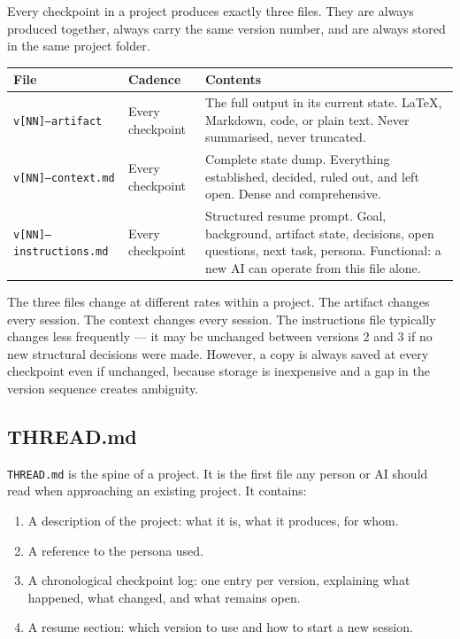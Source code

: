 \documentclass[12pt,letterpaper]{article}
\begin{document}
Every checkpoint in a project produces exactly three files.
They are always produced together, always carry the same version number,
and are always stored in the same project folder.

\begin{center}
\begin{tabular}{@{}lp{4cm}p{5.5cm}@{}}
\toprule
\textbf{File} & \textbf{Cadence} & \textbf{Contents} \\
\midrule
\texttt{v[NN]--artifact} & Every checkpoint & The full output in its current state.
  LaTeX, Markdown, code, or plain text. Never summarised, never truncated. \\
\addlinespace
\texttt{v[NN]--context.md} & Every checkpoint & Complete state dump.
  Everything established, decided, ruled out, and left open.
  Dense and comprehensive. \\
\addlinespace
\texttt{v[NN]--instructions.md} & Every checkpoint & Structured resume prompt.
  Goal, background, artifact state, decisions, open questions, next task, persona.
  Functional: a new AI can operate from this file alone. \\
\bottomrule
\end{tabular}
\end{center}

The three files change at different rates within a project. The artifact changes
every session. The context changes every session. The instructions file typically
changes less frequently --- it may be unchanged between versions 2 and 3 if no
new structural decisions were made. However, a copy is always saved at every
checkpoint even if unchanged, because storage is inexpensive and a gap in the
version sequence creates ambiguity.

\subsection{THREAD.md}

\texttt{THREAD.md} is the spine of a project. It is the first file any person
or AI should read when approaching an existing project. It contains:

\begin{enumerate}
  \item A description of the project: what it is, what it produces, for whom.
  \item A reference to the persona used.
  \item A chronological checkpoint log: one entry per version, explaining what
        happened, what changed, and what remains open.
  \item A resume section: which version to use and how to start a new session.
\end{enumerate}
\end{document}
